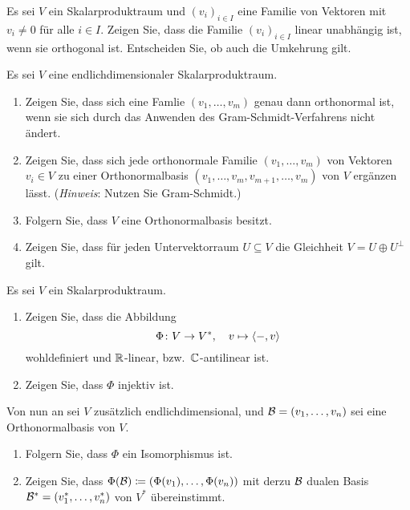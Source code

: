 \documentclass[a4paper, 10pt]{scrartcl}
\begin{document}
\begin{question}
  Es sei $V$ ein Skalarproduktraum und $(v_i)_{i \in I}$ eine Familie von Vektoren mit $v_i \neq 0$ für alle $i \in I$.
  Zeigen Sie, dass die Familie $(v_i)_{i \in I}$ linear unabhängig ist, wenn sie orthogonal ist.
  Entscheiden Sie, ob auch die Umkehrung gilt.
\end{question}


\begin{question}
  Es sei $V$ eine endlichdimensionaler Skalarproduktraum.
  \begin{enumerate}[leftmargin=*]
    \item
      Zeigen Sie, dass sich eine Famlie $(v_1, \dotsc, v_m)$ genau dann orthonormal ist, wenn sie sich durch das Anwenden des Gram-Schmidt-Verfahrens nicht ändert.
    \item
      Zeigen Sie, dass sich jede orthonormale Familie $(v_1, \dotsc, v_m)$ von Vektoren $v_i \in V$ zu einer Orthonormalbasis $(v_1, \dotsc, v_m, v_{m+1}, \dotsc, v_{m})$ von $V$ ergänzen lässt.
      (\emph{Hinweis}: Nutzen Sie Gram-Schmidt.)
    \item
      Folgern Sie, dass $V$ eine Orthonormalbasis besitzt.
    \item
      Zeigen Sie, dass für jeden Untervektorraum $U \subseteq V$ die Gleichheit $V = U \oplus U^\perp$ gilt.
  \end{enumerate}
\end{question}


\begin{question}
  Es sei $V$ ein Skalarproduktraum.
  \begin{enumerate}[leftmargin=*]
    \item
      Zeigen Sie, dass die Abbildung
      \[
        \Phi \colon V \to V^*,
        \quad
        v \mapsto \left\langle -, v \right\rangle
      \]
      wohldefiniert und $\mathbb{R}$-linear, bzw.\ $\mathbb{C}$-antilinear ist.
    \item
      Zeigen Sie, dass $\Phi$ injektiv ist.
  \end{enumerate}
  Von nun an sei $V$ zusätzlich endlichdimensional, und $\mathcal{B} = (v_1, \dotsc, v_n)$ sei eine Orthonormalbasis von $V$.
  \begin{enumerate}[leftmargin=*, resume]
    \item
      Folgern Sie, dass $\Phi$ ein Isomorphismus ist.
    \item
      Zeigen Sie, dass $\Phi(\mathcal{B}) \coloneqq (\Phi(v_1), \dotsc, \Phi(v_n))$ mit derzu $\mathcal{B}$ dualen Basis $\mathcal{B}^* = (v_1^*, \dotsc, v_n^*)$ von $V^*$ übereinstimmt.
  \end{enumerate}
\end{question}
\end{document}
